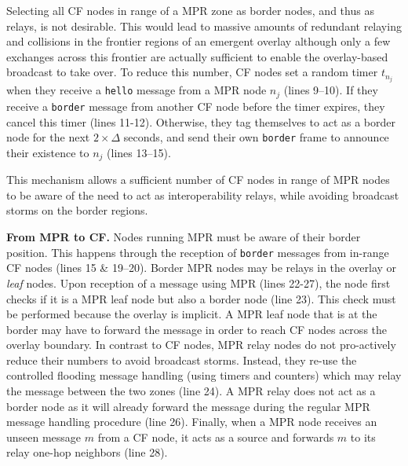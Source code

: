 Selecting all CF nodes in range of a MPR zone as border nodes, and thus as relays, is not desirable. 
This would lead to massive amounts of redundant relaying and collisions in the frontier regions of an emergent overlay although only a few exchanges across this frontier are actually sufficient to enable the overlay-based broadcast to take over.
To reduce this number, CF nodes set a random timer $t_{n_j}$ when they receive a \texttt{hello} message from a MPR node $n_j$ (lines 9--10).
If they receive a \texttt{border} message from another CF node before the timer expires, they cancel this timer (lines 11-12).
Otherwise, they tag themselves to act as a border node for the next $2\times \Delta$ seconds, and send their own \texttt{border} frame to announce their existence to $n_j$ (lines 13--15).

This mechanism allows a sufficient number of CF nodes in range of MPR nodes to be aware of the need to act as interoperability relays, while avoiding broadcast storms on the border regions.

\smallskip
\noindent
\textbf{From MPR to CF.}
%
Nodes running MPR must be aware of their border position.
This  happens through the reception of \texttt{border} messages from in-range CF nodes (lines 15 \& 19--20).
Border MPR nodes may be relays in the overlay or \emph{leaf} nodes.
Upon reception of a message using MPR (lines 22-27), the node first checks if it is a MPR leaf node but also a border node (line 23).
This check must be performed because the overlay is implicit.
A MPR leaf node that is at the border may have to forward the message in order to reach CF nodes across the overlay boundary.
In contrast to CF nodes, MPR relay nodes do not pro-actively reduce their numbers to avoid broadcast storms.
Instead, they  re-use the controlled flooding message handling (using timers and counters) which may relay the message between the two zones (line 24).
A MPR relay does not act as a border node as it will already forward the message during the regular MPR message handling procedure (line 26).
Finally, when a MPR node receives an unseen message $m$ from a CF node, it acts as a source and forwards $m$ to its relay one-hop neighbors (line 28).

